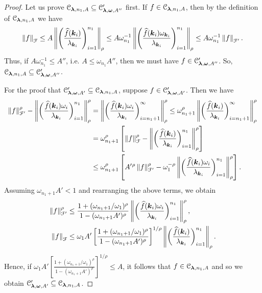 \documentclass[USenglish]{article}
\theoremstyle{dgthm}
\theoremstyle{dgthm}
\theoremstyle{dgthm}
\theoremstyle{dgthm}
\theoremstyle{dgdef}
\theoremstyle{definition}
\newcommand{\DHKMhf}{\widehat{f}}
\newcommand{\DHKMnorm}[2][{}]{\ensuremath{\left \lVert #2 \right \rVert}_{#1}}
\begin{document}
\begin{proof}
Let us prove $
{\mathcal{C}}_{\boldsymbol{\lambda}, n_1, A} \subseteq {\mathcal{C}}'_{\boldsymbol{\lambda}, \boldsymbol{\omega}, A''}$ first.
If $f \in {\mathcal{C}}_{\boldsymbol{\lambda}, n_1, A}$, then by the definition of ${\mathcal{C}}_{\boldsymbol{\lambda}, n_1, A}$ we have
\begin{equation*}
    \DHKMnorm[\calF]{f} \le A \DHKMnorm[\rho]{\left( \frac{\DHKMhf(\bsk_i)}{\lambda_{\bsk_i}} \right)_{i = 1} ^{ n_1}}
     \le A \omega_{n_1}^{-1} \DHKMnorm[\rho]{\left( \frac{\DHKMhf(\bsk_i)\omega_{\bsk_i}}{\lambda_{\bsk_i}} \right)_{i =1} ^{n_1}}
     \le A \omega_{n_1}^{-1} \DHKMnorm[\calF']{f}.
\end{equation*}
Thus, if $A\omega_{n_1}^{-1} \le A''$, i.e. $A \le \omega_{n_1} A'' $, then
we must have $f \in {\mathcal{C}}'_{\boldsymbol{\lambda}, \boldsymbol{\omega}, A''}$.  So, $
{\mathcal{C}}_{\boldsymbol{\lambda}, n_1, A} \subseteq {\mathcal{C}}'_{\boldsymbol{\lambda}, \boldsymbol{\omega}, A''}$.

For the proof that 
${\mathcal{C}}'_{\boldsymbol{\lambda}, \boldsymbol{\omega}, A'}
\subseteq 
{\mathcal{C}}_{\boldsymbol{\lambda}, n_1, A}$, 
suppose $f \in {\mathcal{C}}'_{\boldsymbol{\lambda},\boldsymbol{\omega},  A'}$. Then we have
\begin{align*}
    \DHKMnorm[\calF']{f}^\rho- \DHKMnorm[\rho]{\biggl ( \frac{\DHKMhf(\bsk_i) \omega_i }{\lambda_{\bsk_i}} \biggr) _{i=1}^{n_1}}^\rho 
	& = \DHKMnorm[\rho]{\biggl ( \frac{\DHKMhf(\bsk_i) \omega_i }{\lambda_{\bsk_i}} \biggr) _{i=n_1 + 1}^{\infty}}^\rho 
     \le \omega_{n_1+1}^\rho \DHKMnorm[\rho]{\biggl ( \frac{\DHKMhf(\bsk_i) }{\lambda_{\bsk_i}} \biggr) _{i=n_1 + 1}^{\infty}}^\rho \\
     & = \omega_{n_1+1}^\rho \left[ \DHKMnorm[\calF]{f}^\rho - \DHKMnorm[\rho]{\biggl ( \frac{\DHKMhf(\bsk_i) }{\lambda_{\bsk_i}} \biggr) _{i=1}^{n_1}}^\rho \right ]\\	
     & \le \omega_{n_1+1}^\rho \left[ A'{}^\rho \DHKMnorm[\calF']{f}^\rho - \omega_1^{-\rho} \DHKMnorm[\rho]{\biggl ( \frac{\DHKMhf(\bsk_i) \omega_i}{\lambda_{\bsk_i}} \biggr) _{i=1}^{n_1}}^\rho \right ].
\end{align*}
Assuming $\omega_{n_1+1}A' < 1$ and rearranging the above terms, we obtain
\begin{align*}
\DHKMnorm[\calF']{f}^\rho & \le \frac{1 + (\omega_{n_1+1}/\omega_1)^\rho}{1 - (\omega_{n_1+1}A')^\rho} \DHKMnorm[\rho]{\biggl ( \frac{\DHKMhf(\bsk_i) \omega_i }{\lambda_{\bsk_i}} \biggr) _{i=1}^{n_1}}^\rho, \\
	\DHKMnorm[\calF]{f} & \le \omega_1A'\left[\frac{1 + (\omega_{n_1+1}/\omega_1)^\rho}{1 - (\omega_{n_1+1}A')^\rho}\right]^{1/\rho} \DHKMnorm[\rho]{\biggl ( \frac{\DHKMhf(\bsk_i)}{\lambda_{\bsk_i}} \biggr) _{i=1}^{n_1}}.
\end{align*}
Hence, if $\omega_1A'\left[\frac{1 + (\omega_{n_1+1}/\omega_1)^\rho}{1 - (\omega_{n_1+1}A')^\rho}\right]^{1/\rho} \le A$, it follows that $f \in {\mathcal{C}}_{\boldsymbol{\lambda}, n_1, A}$ and so
we obtain $
{\mathcal{C}}'_{\boldsymbol{\lambda}, \boldsymbol{\omega}, A'}
\subseteq
{\mathcal{C}}_{\boldsymbol{\lambda}, n_1, A}
$.
\end{proof}
\end{document}
